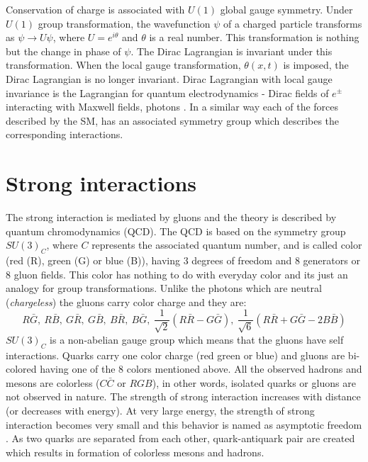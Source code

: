 Conservation of charge is associated with $U(1)$ global gauge symmetry. Under $U(1)$ group transformation, the wavefunction $\psi$ of a 
charged particle transforms as $\psi \to U\psi$, where $U = e^{i\theta}$ and $\theta$ is a real number. This transformation is nothing but 
the change in phase of $\psi$. The Dirac Lagrangian is invariant under this transformation. When the local gauge transformation, 
$\theta(x,t)$ is imposed, the Dirac Lagrangian is no longer invariant. Dirac Lagrangian with local gauge invariance is the Lagrangian for 
quantum electrodynamics - Dirac fields of $e^\pm$ interacting with Maxwell fields, photons \cite{Griffiths:2008zz}.
In a similar way each of the forces described by the SM, has an associated symmetry group which describes the corresponding interactions.

\section{Strong interactions}
The strong interaction is mediated by gluons and the theory is described by quantum chromodynamics (QCD). The QCD is based on the symmetry 
group $SU(3)_C$, where $C$ represents the associated quantum number, and is called color (red (R), green (G) or blue (B)), having 3 degrees of freedom and 8 generators or 8 gluon 
fields. 
This color has nothing to do with everyday color and its just an analogy for group transformations. Unlike the photons which are neutral
(\textit{chargeless}) the gluons carry color charge and they are:
\begin{equation*}
R\bar{G},\ R\bar{B},\ G\bar{R},\ G\bar{B},\ B\bar{R},\ B\bar{G},\ \frac{1}{\sqrt{2}}(R\bar{R}-G\bar{G}),\ \frac{1}{\sqrt{6}}(R\bar{R}+G\bar{G}-2B\bar{B}) 
\end{equation*}
$SU(3)_C$ is a non-abelian gauge group which means that the gluons have self interactions. Quarks carry one color charge (red green or 
blue) and gluons are bi-colored having one of the 8 colors mentioned above. All the observed hadrons and mesons are colorless ($C\bar{C}$ 
or $RGB$), in other words, isolated quarks or gluons are not observed in nature. The strength of strong interaction increases with distance (or decreases 
with energy). At very large energy, the strength of strong interaction becomes very small and this behavior is named as asymptotic freedom 
\cite{PhysRevLett.30.1343}\cite{PhysRevLett.30.1346}. As two quarks are separated from each other, quark-antiquark pair are created which 
results in formation of colorless mesons and hadrons.

